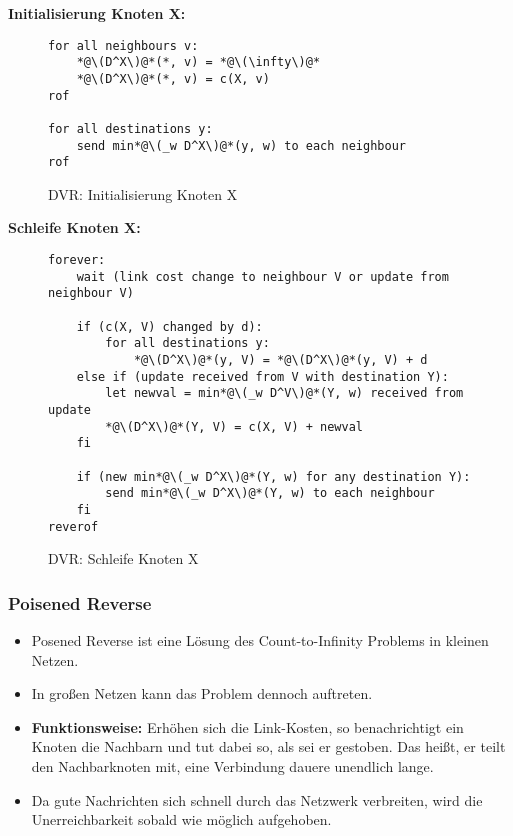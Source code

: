                 \textbf{Initialisierung Knoten X:}
                \begin{figure}[H]
                	\centering
                	\begin{lstlisting}
for all neighbours v:
	*@\(D^X\)@*(*, v) = *@\(\infty\)@*
	*@\(D^X\)@*(*, v) = c(X, v)
rof

for all destinations y:
	send min*@\(_w D^X\)@*(y, w) to each neighbour
rof
                	\end{lstlisting}
                	\caption{DVR: Initialisierung Knoten X}
                \end{figure}
                
                \textbf{Schleife Knoten X:}
                \begin{figure}[H]
                	\centering
                	\begin{lstlisting}
forever:
	wait (link cost change to neighbour V or update from neighbour V)

	if (c(X, V) changed by d):
		for all destinations y:
			*@\(D^X\)@*(y, V) = *@\(D^X\)@*(y, V) + d
	else if (update received from V with destination Y):
		let newval = min*@\(_w D^V\)@*(Y, w) received from update
		*@\(D^X\)@*(Y, V) = c(X, V) + newval
	fi

	if (new min*@\(_w D^X\)@*(Y, w) for any destination Y):
		send min*@\(_w D^X\)@*(Y, w) to each neighbour
	fi
reverof
                	\end{lstlisting}
                	\caption{DVR: Schleife Knoten X}
                \end{figure}

            \subsubsection{Poisened Reverse}
                \begin{itemize}
                	\item Posened Reverse ist eine Lösung des Count-to-Infinity Problems in kleinen Netzen.
                	\item In großen Netzen kann das Problem dennoch auftreten.
                	\item \textbf{Funktionsweise:} Erhöhen sich die Link-Kosten, so benachrichtigt ein Knoten die Nachbarn und tut dabei so, als sei er gestoben. Das heißt, er teilt den Nachbarknoten mit, eine Verbindung dauere unendlich lange.
                	\item Da gute Nachrichten sich schnell durch das Netzwerk verbreiten, wird die Unerreichbarkeit sobald wie möglich aufgehoben.
                \end{itemize}
                
